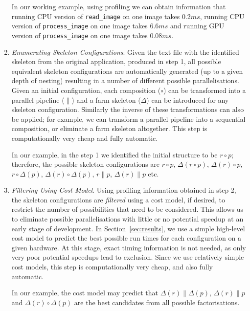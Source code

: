 \documentclass[smallextended]{svjour3}
\begin{document}
\begin{enumerate}
  In our working example, using profiling we can obtain information that
  running CPU version of \lstinline|read_image| on one image takes $0.2ms$, running
  CPU version of \lstinline|process_image| on one image takes $6.6ms$ and running
  GPU version of \lstinline|process_image| on one image takes $0.08ms$.

\item \emph{Enumerating Skeleton Configurations}. Given the text file
  with the identified skeleton from the original application, produced
  in step 1, all possible
  equivalent skeleton configurations are automatically generated (up to a given depth of nesting)
  resulting in a number of different possible parallelisations. 
  Given an initial configuration, each composition ($\circ$) can be transformed into a parallel pipeline ($\parallel$) and
  a farm skeleton ($\Delta$) can be introduced for any skeleton configuration. Similarly the inverse of these transformations
  can also be applied; for example, we can transform a parallel
  pipeline into a sequential composition, or eliminate a farm skeleton
  altogether. This step is computationally very cheap and fully automatic.

  In our example, in the step 1 we identified the initial structure to be $r \circ p$;  therefore, the possible
  skeleton configurations are $r \circ p$, $\Delta(r \circ p)$, $\Delta(r) \circ
  p$, $r \circ \Delta(p)$, $\Delta(r) \circ \Delta(p)$, $r \parallel
  p$, $\Delta(r) \parallel p$ etc. 
\item \emph{Filtering Using Cost Model}. Using profiling information
  obtained in step 2, the skeleton configurations are \emph{filtered} using a cost model, if desired,
  to restrict the number of possibilities that need to be considered.
  This allows us to eliminate possible parallelisations with little or no potential
  speedup at an early stage of development.  In
  Section~\ref{sec:results}, we use a simple high-level cost model to predict
  the best possible run times for each configuration on a given hardware. At
  this stage, exact timing information is not needed, as only very
  poor potential speedups lead to exclusion. Since we use relatively
  simple cost models, this step is computationally very cheap, and
  also fully automatic.

In our example, the cost model may predict that $\Delta(r) \parallel
\Delta(p)$, $\Delta(r) \parallel p$ and $\Delta(r) \circ \Delta(p)$
are the best candidates from all possible factorisations.


\end{enumerate}
\end{document}
